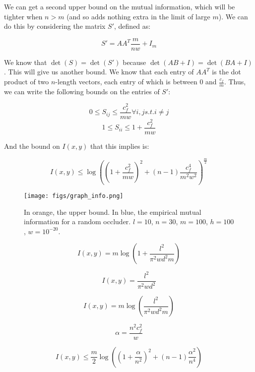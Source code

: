 \documentclass[11pt]{article}
\begin{document}
We can get a second upper bound on the mutual information, which will be tighter when $n > m$ (and so adds nothing extra in the limit of large $m$). We can do this by considering the matrix $S'$, defined as:

\begin{equation}
    S' = A A^T \frac{m}{n w} + I_m
\end{equation}

We know that $\det(S) = \det(S')$ because $\det(AB + I) = \det(BA + I)$. This will give us another bound. We know that each entry of $A A^T$ is the dot product of two $n$-length vectors, each entry of which is between 0 and $\frac{c_f}{m}$. Thus, we can write the following bounds on the entries of $S'$:

\begin{equation}
    0 \le S_{ij} \le \frac{c_f^2}{m w} \forall i,j s.t. i\not=j
\end{equation}
\begin{equation}
    1 \le S_{ii} \le 1+\frac{c_f^2}{m w}
\end{equation}

And the bound on $I(x, y)$ that this implies is:

\begin{equation}
    I(x, y) \le \log((1 + \frac{c_f^2}{m w})^2 + (n-1)\frac{c_f^4}{m^2 w^2})^\frac{m}{2}
\end{equation}

\begin{figure}
\centering
\texttt{[image: figs/graph\_info.png]}
\caption{In orange, the upper bound. In blue, the empirical mutual information for a random occluder. $l = 10$, $n = 30$, $m = 100$, $h = 100$, $w = 10^{-20}$.}
\label{fig:scene_setup}
\end{figure}

$$I(x, y) = m \log(1 + \frac{l^2}{\pi^2 w d^2 m})$$

$$I(x, y) = \frac{l^2}{\pi^2 w d^2}$$ 

$$I(x, y) = m \log(\frac{l^2}{\pi^2 w d^2 m})$$

$$\alpha = \frac{n^2 c_f^2}{w}$$


$$I(x, y) \le \frac{m}{2} \log((1 + \frac{\alpha}{n^2})^2 + (n-1)\frac{\alpha^2}{n^4})$$
\end{document}
